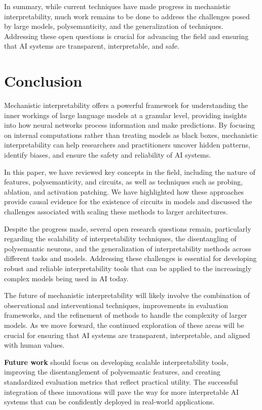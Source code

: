 \documentclass[sigconf,authoryear]{acmart}
\begin{document}
 
  In summary, while current techniques have made progress in mechanistic interpretability, much work remains to be done to address the challenges posed by large models, polysemanticity, and the generalization of techniques. Addressing these open questions is crucial for advancing the field and ensuring that AI systems are transparent, interpretable, and safe.
  

  \section{Conclusion}

  Mechanistic interpretability offers a powerful framework for understanding the inner workings of large language models at a granular level, providing insights into how neural networks process information and make predictions. By focusing on internal computations rather than treating models as black boxes, mechanistic interpretability can help researchers and practitioners uncover hidden patterns, identify biases, and ensure the safety and reliability of AI systems.
  
  In this paper, we have reviewed key concepts in the field, including the nature of features, polysemanticity, and circuits, as well as techniques such as probing, ablation, and activation patching. We have highlighted how these approaches provide causal evidence for the existence of circuits in models and discussed the challenges associated with scaling these methods to larger architectures.
  
  Despite the progress made, several open research questions remain, particularly regarding the scalability of interpretability techniques, the disentangling of polysemantic neurons, and the generalization of interpretability methods across different tasks and models. Addressing these challenges is essential for developing robust and reliable interpretability tools that can be applied to the increasingly complex models being used in AI today.
  
  The future of mechanistic interpretability will likely involve the combination of observational and interventional techniques, improvements in evaluation frameworks, and the refinement of methods to handle the complexity of larger models. As we move forward, the continued exploration of these areas will be crucial for ensuring that AI systems are transparent, interpretable, and aligned with human values.
  
  \textbf{Future work} should focus on developing scalable interpretability tools, improving the disentanglement of polysemantic features, and creating standardized evaluation metrics that reflect practical utility. The successful integration of these innovations will pave the way for more interpretable AI systems that can be confidently deployed in real-world applications.
  



\end{document}
